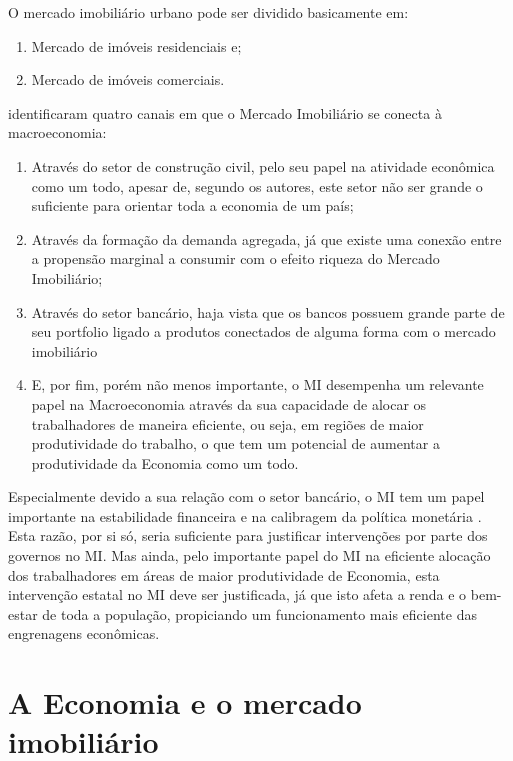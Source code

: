 \documentclass[
	12pt,				%
	oneside,			%
	a4paper,			%
	chapter=TITLE,		%
	section=TITLE,		%
	english,			%
	brazil				%
	]{abntex2}
\begin{document}
O mercado imobiliário urbano pode ser dividido basicamente em:
\begin{enumerate}
\def\labelenumi{\arabic{enumi}.}
\tightlist
\item
  Mercado de imóveis residenciais e;
\item
  Mercado de imóveis comerciais.
\end{enumerate}
\textcite{Case2000} identificaram quatro canais em que o Mercado Imobiliário se
conecta à macroeconomia:
\begin{enumerate}
\def\labelenumi{\arabic{enumi}.}
\tightlist
\item
  Através do setor de construção civil, pelo seu papel na atividade econômica
  como um todo, apesar de, segundo os autores, este setor não ser grande o
  suficiente para orientar toda a economia de um país;
\item
  Através da formação da demanda agregada, já que existe uma conexão entre a
  propensão marginal a consumir com o efeito riqueza do Mercado Imobiliário;
\item
  Através do setor bancário, haja vista que os bancos possuem grande parte de
  seu portfolio ligado a produtos conectados de alguma forma com o mercado
  imobiliário
\item
  E, por fim, porém não menos importante, o \gls{MI} desempenha um relevante
  papel na Macroeconomia através da sua capacidade de alocar os trabalhadores de
  maneira eficiente, ou seja, em regiões de maior produtividade do trabalho, o que
  tem um potencial de aumentar a produtividade da Economia como um todo.
\end{enumerate}
Especialmente devido a sua relação com o setor bancário, o \gls{MI} tem um papel
importante na estabilidade financeira e na calibragem da política monetária
\autocite{Zhu}. Esta razão, por si só, seria suficiente para justificar intervenções
por parte dos governos no \gls{MI}. Mas ainda, pelo importante papel do \gls{MI}
na eficiente alocação dos trabalhadores em áreas de maior produtividade de
Economia, esta intervenção estatal no \gls{MI} deve ser justificada, já que isto
afeta a renda e o bem-estar de toda a população, propiciando um funcionamento
mais eficiente das engrenagens econômicas.

\hypertarget{a-economia-e-o-mercado-imobiliuxe1rio}{%
\section{A Economia e o mercado imobiliário}\label{a-economia-e-o-mercado-imobiliuxe1rio}}
\end{document}

